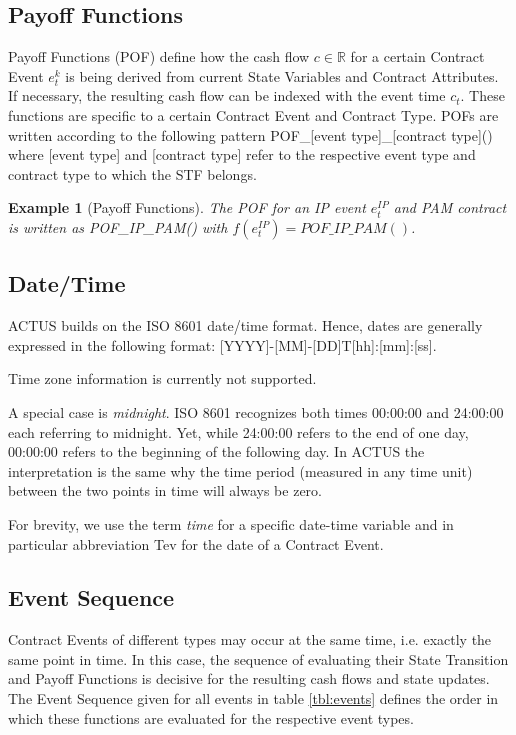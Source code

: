 \documentclass[9pt,oneside]{amsart}
\newtheorem{example}{Example}
\newcommand{\Real}{\mathbb{R}}
\newcommand{\pof}[2]{POF\_#1\_#2()}
\newcommand{\fev}[1]{f(#1)}
\begin{document}
\begin{multicols}{2}
\subsection{Payoff Functions}\label{sec:pof}

Payoff Functions (POF) define how the cash flow $c\in\Real$ for a certain Contract Event $e_t^k$ is being derived from current State Variables and Contract Attributes. If necessary, the resulting cash flow can be indexed with the event time $c_t$. These functions are specific to a certain Contract Event and Contract Type. POFs are written according to the following pattern \pof{[event type]}{[contract type]} where [event type] and [contract type] refer to the respective event type and contract type to which the STF belongs.

\begin{example}[Payoff Functions]
The POF for an IP event $e_t^{IP}$ and PAM contract is written as \pof{IP}{PAM} with $\fev{e_t^{IP}}=\pof{IP}{PAM}$.
\end{example}


\subsection{Date/Time}

ACTUS builds on the ISO 8601 date/time format. Hence, dates are generally expressed in the following format: [YYYY]-[MM]-[DD]T[hh]:[mm]:[ss].

Time zone information is currently not supported.

A special case is \textit{midnight}. ISO 8601 recognizes both times 00:00:00 and 24:00:00 each referring to midnight. Yet, while 24:00:00 refers to the end of one day, 00:00:00 refers to the beginning of the following day. In ACTUS the interpretation is the same why the time period (measured in any time unit) between the two points in time will always be zero. 

For brevity, we use the term \textit{time} for a specific date-time variable and in particular abbreviation Tev for the date of a Contract Event.


\subsection{Event Sequence}

Contract Events of different types may occur at the same time, i.e. exactly the same point in time. In this case, the sequence of evaluating their State Transition and Payoff Functions is decisive for the resulting cash flows and state updates. The Event Sequence given for all events in table \ref{tbl:events} defines the order in which these functions are evaluated for the respective event types.



\end{multicols}
\end{document}
